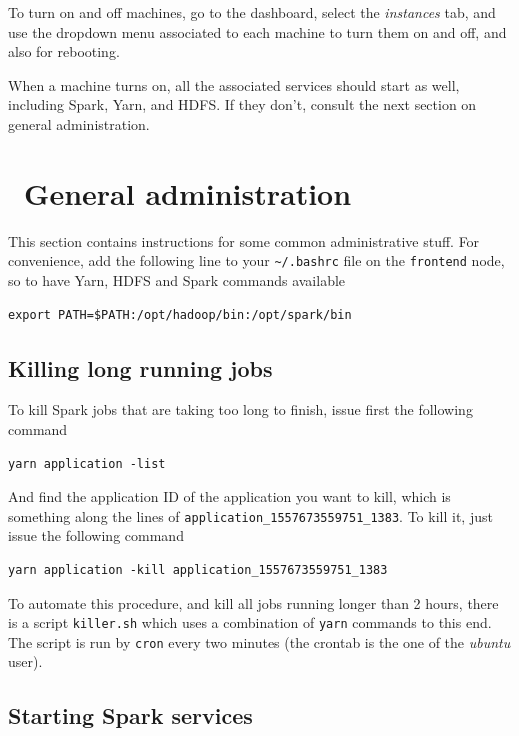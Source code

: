 \documentclass[justified]{tufte-handout}
\begin{document}
To turn on and off machines, go to the dashboard, select the
\emph{instances} tab, and use the dropdown menu associated to each
machine to turn them on and off, and also for rebooting.

When a machine turns on, all the associated services should start as
well, including Spark, Yarn, and HDFS. If they don't, consult the next
section on general administration.

\section{~General administration}\label{general-administration}

This section contains instructions for some common administrative stuff.
For convenience, add the following line to your
\texttt{\textasciitilde{}/.bashrc} file on the \texttt{frontend} node,
so to have Yarn, HDFS and Spark commands available

\begin{verbatim}
export PATH=$PATH:/opt/hadoop/bin:/opt/spark/bin
\end{verbatim}

\subsection{Killing long running jobs}

To kill Spark jobs that are taking too long to finish, issue first the following command

\begin{verbatim}
yarn application -list
\end{verbatim}

And find the application ID of the application you want to kill, which is something along the lines of \texttt{application\_1557673559751\_1383}.
To kill it, just issue the following command

\begin{verbatim}
yarn application -kill application_1557673559751_1383
\end{verbatim}

To automate this procedure, and kill all jobs running longer than 2 hours, there is a script
\lstinline{killer.sh} which uses a combination of \lstinline{yarn} commands to this end.
The script is run by \lstinline{cron} every two minutes (the crontab is the one of the \emph{ubuntu} user).

\subsection{Starting Spark services}\label{starting-spark-services}
\end{document}
